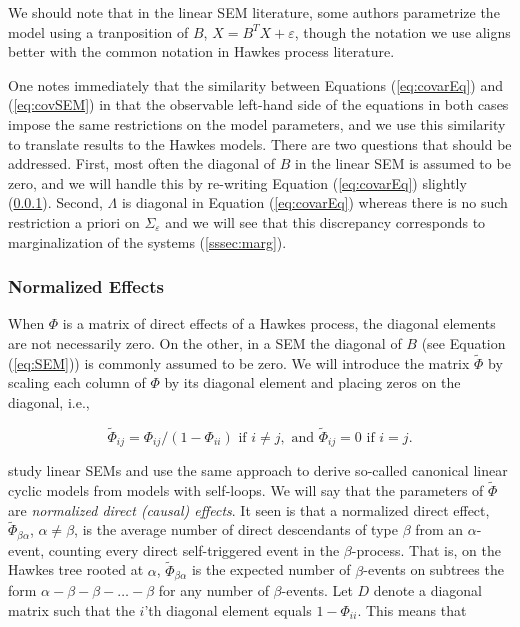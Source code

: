 \documentclass[accepted]{uai2021} %
\begin{document}
We should note that in the linear SEM literature, some authors parametrize the 
model using a 
tranposition of $B$, $X = B^TX + \varepsilon$, though the notation we use 
aligns better with the common 
notation 
in Hawkes process literature.

One notes immediately that the similarity between Equations (\ref{eq:covarEq}) 
and (\ref{eq:covSEM}) in that the observable left-hand side of the equations in 
both cases impose the same restrictions on the model parameters, and we use 
this similarity to translate results to the Hawkes models. There are two 
questions that should be addressed. First, most often the diagonal of $B$ in 
the linear SEM is assumed to be zero, and we will handle this by re-writing 
Equation (\ref{eq:covarEq}) slightly (\ref{sssec:normEff}). Second, $\Lambda$ 
is diagonal in Equation (\ref{eq:covarEq}) whereas there is no such restriction 
a priori on $\Sigma_\varepsilon$ and we will see that this discrepancy 
corresponds to marginalization of the systems (\ref{sssec:marg}).


\subsubsection{Normalized Effects}
\label{sssec:normEff}

When $\Phi$ is a matrix of direct effects of a Hawkes process, the diagonal 
elements are not necessarily zero. On the other, in a SEM the diagonal of $B$ 
(see Equation (\ref{eq:SEM})) is commonly assumed to be zero. We will introduce 
the matrix $\tilde{\Phi}$ by scaling each column of $\Phi$ by its 
diagonal element and placing zeros on the diagonal, i.e.,

$$
\tilde{\Phi}_{ij} = \Phi_{ij}/(1-\Phi_{ii})  \text{ if } i\neq j, \text{ and } 
\tilde{\Phi}_{ij} 
= 0 \text{ if } i= j.
$$

\cite{hyttinen2012} study linear SEMs and use the same approach to derive 
so-called canonical linear 
cyclic models from models with self-loops. We 
will say that the parameters of $\tilde{\Phi}$ are \emph{normalized direct
(causal) effects}. It seen is that a normalized direct effect, 
$\tilde{\Phi}_{\beta\alpha}$, $\alpha\neq\beta$, is the average number of 
direct 
descendants of type 
$\beta$ from an $\alpha$-event, counting every direct self-triggered event in 
the $\beta$-process. 
That is, on the Hawkes tree rooted at $\alpha$, $\tilde{\Phi}_{\beta\alpha}$ is 
the expected number of $\beta$-events on subtrees the form $\alpha - \beta - 
\beta - \ldots - 
\beta$ for any number of $\beta$-events. 
Let $D$ denote a 
diagonal matrix such that the $i$'th diagonal element equals 
$1 - \Phi_{ii}$. This means that 
\end{document}
